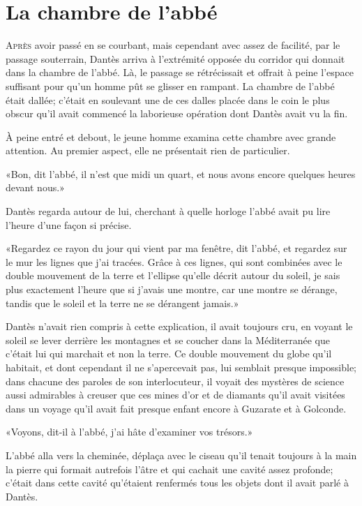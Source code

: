 \chapter{La chambre de l'abbé}

\lettrine{A}{près} avoir passé en se courbant, mais cependant avec assez de facilité, par le passage souterrain, Dantès arriva à l'extrémité opposée du corridor qui donnait dans la chambre de l'abbé. Là, le passage se rétrécissait et offrait à peine l'espace suffisant pour qu'un homme pût se glisser en rampant. La chambre de l'abbé était dallée; c'était en soulevant une de ces dalles placée dans le coin le plus obscur qu'il avait commencé la laborieuse opération dont Dantès avait vu la fin.

À peine entré et debout, le jeune homme examina cette chambre avec grande attention. Au premier aspect, elle ne présentait rien de particulier.

«Bon, dit l'abbé, il n'est que midi un quart, et nous avons encore quelques heures devant nous.»

Dantès regarda autour de lui, cherchant à quelle horloge l'abbé avait pu lire l'heure d'une façon si précise.

«Regardez ce rayon du jour qui vient par ma fenêtre, dit l'abbé, et regardez sur le mur les lignes que j'ai tracées. Grâce à ces lignes, qui sont combinées avec le double mouvement de la terre et l'ellipse qu'elle décrit autour du soleil, je sais plus exactement l'heure que si j'avais une montre, car une montre se dérange, tandis que le soleil et la terre ne se dérangent jamais.»

Dantès n'avait rien compris à cette explication, il avait toujours cru, en voyant le soleil se lever derrière les montagnes et se coucher dans la Méditerranée que c'était lui qui marchait et non la terre. Ce double mouvement du globe qu'il habitait, et dont cependant il ne s'apercevait pas, lui semblait presque impossible; dans chacune des paroles de son interlocuteur, il voyait des mystères de science aussi admirables à creuser que ces mines d'or et de diamants qu'il avait visitées dans un voyage qu'il avait fait presque enfant encore à Guzarate et à Golconde.

«Voyons, dit-il à l'abbé, j'ai hâte d'examiner vos trésors.»

L'abbé alla vers la cheminée, déplaça avec le ciseau qu'il tenait toujours à la main la pierre qui formait autrefois l'âtre et qui cachait une cavité assez profonde; c'était dans cette cavité qu'étaient renfermés tous les objets dont il avait parlé à Dantès.

